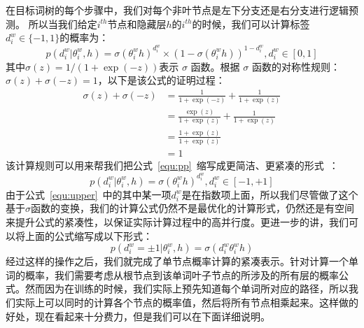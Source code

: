 在目标词树的每个步骤中，我们对每个非叶节点是左下分支还是右分支进行逻辑预测。 所以当我们给定$ i^{th} $节点和隐藏层$ h $的$ i^{th} $的时候，我们可以计算标签 $d^w_i\in \{-1,1\}$的概率为：
 \begin{equation}\label{equ:pp}
p(d^w_i|\theta_{i}^w,h) =\sigma(\theta_{i}^w h)^{d_i^w}\times(1-\sigma(\theta_{i}^w h))^{1-{d_i^w}},d_i^w \in [0,1]
\end{equation}
其中$ \sigma(z)= 1 /(1 + \exp(-z))$表示 $\sigma$ 函数。根据 $\sigma$ 函数的对称性规则：$\sigma(z)+ \sigma(-z)=1 $，以下是该公式的证明过程：
\begin{equation}\label{equ:sig}
\begin{split}
\sigma(z)+ \sigma(-z)  &=\frac{1}{1 + \exp(-z)}+\frac{1}{1 + \exp(z)}\\
  &=\frac{\exp(z)}{1 + \exp(z)}+\frac{1}{1 + \exp(z)}\\
  &=\frac{1 + \exp(z)}{1 + \exp(z)}\\
  &=1
\end{split}
\end{equation}
该计算规则可以用来帮我们把公式~\ref{equ:pp}~缩写成更简洁、更紧凑的形式~：
 \begin{equation}\label{equ:upper}
p(d^w_i|\theta_{i}^w,h) =\sigma(\theta_{i}^w h)^{d_i^w}, d_i^w \in [-1,+1]
\end{equation}
由于公式~\ref{equ:upper}~中的其中某一项${d_i^w}$是在指数项上面，所以我们尽管做了这个基于$\sigma$函数的变换，我们的计算公式仍然不是最优化的计算形式，仍然还是有空间来提升公式的紧凑性，以保证实际计算过程中的高并行度。更进一步的讲，我们可以将上面的公式缩写成以下形式：
\begin{equation}
p(d^w_i=\pm 1|\theta_{i}^w,h) = \sigma({d_i^w}\theta_{i}^w h)
\end{equation}
经过这样的操作之后，我们就完成了单节点概率计算的紧凑表示。针对计算一个单词的概率，我们需要考虑从根节点到该单词叶子节点的所涉及的所有层的概率公式。然而因为在训练的时候，我们实际上预先知道每个单词所对应的路径，所以我们实际上可以同时的计算各个节点的概率值，然后将所有节点相乘起来。这样做的好处，现在看起来十分费力，但是我们可以在下面详细说明。


